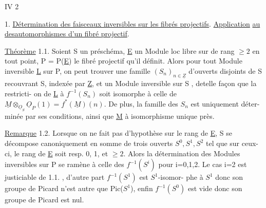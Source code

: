 
IV 2 

1. \uline{Détermination des faisceaux inversibles sur les fibrés projectifs}.
\uline{Application} \uline{au  des}\hand{/}\uline{automorphismes d'un fibré projectif}.

\uline{Théorème} 1.1. Soient S un préschéma, \underline{E} un Module loc libre sur  de
rang  $\geqslant 2$ en tout point,
 P = P(\underline{E}) le fibré projectif qu'il définit. Alors
\margin{*} pour tout Module inversible \underline{L} sur P, on peut trouver une famille
 $(S_n)_{n\in\underline{Z}}$ d'ouverts disjoints de S recouvrant S, indexée par \underline{Z}, et
 un Module inversible  sur S , detelle façon que
 la restricti-%
on de \underline{L} à $f^{-1}(S_n)$ soit isomorphe à celle de $\underline{M}\otimes_{\underline{O}_S}\underline{O}_P(1) = f^*(\underline{M})(n)$.
De plus, la  famille des $S_n$  est uniquement déter-%
minée par ses conditions, ainsi que \underline{M} à isomorphisme unique près.

\uline{Remarque} 1.2. Lorsque on ne fait pas d'hypothèse sur le rang de \underline{E}, S se
décompose canoniquement en somme de trois ouverts $S^0,S^1,S^2$ tel que sur
ceux-ci, le rang de \underline{E} soit resp. 0, 1, et $\geqslant 2$. Alors la détermination des
Modules inversibles sur P se ramène à celle des $f^{-1}(S^{i})$ pour i=0,1,2.
Le cas i=2 est justiciable de 1.1. , d'autre part $f^{-1}(S^1)$ est $S^1$-isomor-%
phe à $S^1$ donc son groupe de Picard n'est autre que Pic($S^1$), enfin
$f^{-1}(S^0)$ est vide donc son groupe de Picard est nul.

